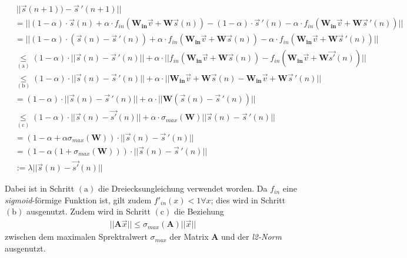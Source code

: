 \begin{appendices}
\begin{align*}
&~||\vec{s}(n+1))- \vec{s}\,'(n+1)|| \\
&= ||(1 - \alpha) \cdot \vec{s}(n)  + \alpha \cdot f_{in}\left( \mathbf{W_{in}} \vec{v} + \mathbf{W} \vec{s}(n) \right) - (1 - \alpha) \cdot \vec{s}\,'(n)  - \alpha \cdot f_{in}\left( \mathbf{W_{in}} \vec{v} + \mathbf{W} \vec{s}\,'(n) \right)|| \\
&= || (1-\alpha)\cdot(\vec{s}(n)-\vec{s}\,'(n)) + \alpha \cdot f_{in}\left( \mathbf{W_{in}} \vec{v} + \mathbf{W} \vec{s}(n) \right) - \alpha \cdot f_{in}\left( \mathbf{W_{in}} \vec{v} + \mathbf{W} \vec{s}\,'(n) \right) ||\\
&\underset{\mathrm{(a)}}{\leq} (1-\alpha)\cdot|| \vec{s}(n)-\vec{s}\,'(n)|| + \alpha \cdot ||f_{in}\left( \mathbf{W_{in}} \vec{v} + \mathbf{W} \vec{s}(n) \right) - f_{in}\left( \mathbf{W_{in}} \vec{v} + \mathbf{W} \vec{s'}(n) \right) ||\\
&\underset{\mathrm{(b)}}{\leq} (1-\alpha)\cdot|| \vec{s}(n)-\vec{s}\,'(n)|| + \alpha \cdot ||\mathbf{W_{in}} \vec{v} + \mathbf{W} \vec{s}(n)- \mathbf{W_{in}} \vec{v} + \mathbf{W} \vec{s}\,'(n) ||\\
&= (1-\alpha)\cdot|| \vec{s}(n)-\vec{s}\,'(n)|| + \alpha \cdot ||\mathbf{W} \left(\vec{s}(n)- \vec{s}\,'(n) \right)||\\
&\underset{\mathrm{(c)}}{\leq} (1-\alpha)\cdot ||\vec{s}(n)-\vec{s'}(n)|| + \alpha \cdot \sigma_{max}\left(\mathbf{W}\right)||\vec{s}(n)- \vec{s}\,'(n) ||\\
&= \left(1-\alpha+\alpha\sigma_{max} \left(\mathbf{W} \right) \right) \cdot ||\vec{s}(n)-\vec{s}\,'(n)|| \\
&= \left(1-\alpha(1+\sigma_{max} \left(\mathbf{W} \right)) \right) \cdot ||\vec{s}(n)-\vec{s}\,'(n)|| \\
&:= \lambda ||\vec{s}(n)-\vec{s'}(n)||
\end{align*}

Dabei ist in Schritt $\mathrm{(a)}$ die Dreiecksungleichung verwendet worden. Da $f_{in}$ eine \textit{sigmoid}-förmige Funktion ist, gilt zudem $f'_{in}(x) < 1 \forall x$; dies wird in Schritt $\mathrm{(b)}$ ausgenutzt. Zudem wird in Schritt $\mathrm{(c)}$ die Beziehung
\begin{align*}
||\mathbf{A} \vec{x}|| \leq \sigma_{max}\left(\mathbf{A} \right) ||\vec{x}||
\end{align*}
zwischen dem maximalen Sprektralwert $\sigma_{max}$ der Matrix $\mathbf{A}$ und der \textit{l2-Norm} ausgenutzt.\\


\end{appendices}
